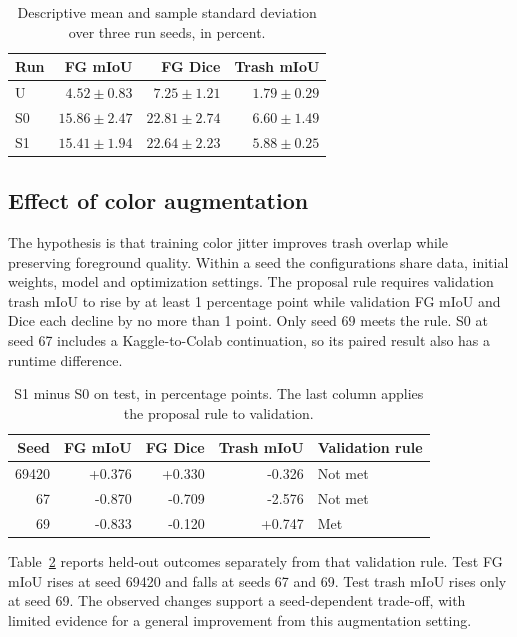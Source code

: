 \begin{table}[H]\centering\small
\caption{Descriptive mean and sample standard deviation over three run seeds, in percent.}\label{tab:final-aggregate}
\begin{tabular}{@{}lrrr@{}}\toprule
Run & FG mIoU & FG Dice & Trash mIoU \\\midrule
U & $4.52 \pm 0.83$ & $7.25 \pm 1.21$ & $1.79 \pm 0.29$ \\
S0 & $15.86 \pm 2.47$ & $22.81 \pm 2.74$ & $6.60 \pm 1.49$ \\
S1 & $15.41 \pm 1.94$ & $22.64 \pm 2.23$ & $5.88 \pm 0.25$ \\
\bottomrule
\end{tabular}
\end{table}

\subsection{Effect of color augmentation}
The hypothesis is that training color jitter improves trash overlap while preserving foreground quality. Within a seed the configurations share data, initial weights, model and optimization settings. The proposal rule requires validation trash mIoU to rise by at least 1 percentage point while validation FG mIoU and Dice each decline by no more than 1 point. Only seed 69 meets the rule. S0 at seed 67 includes a Kaggle-to-Colab continuation, so its paired result also has a runtime difference.

\begin{table}[H]\centering\small
\caption{S1 minus S0 on test, in percentage points. The last column applies the proposal rule to validation.}\label{tab:final-paired-deltas}
\begin{tabular}{@{}rrrrl@{}}\toprule
Seed & FG mIoU & FG Dice & Trash mIoU & Validation rule \\\midrule
69420 & +0.376 & +0.330 & -0.326 & Not met \\
67 & -0.870 & -0.709 & -2.576 & Not met \\
69 & -0.833 & -0.120 & +0.747 & Met \\
\bottomrule
\end{tabular}
\end{table}

Table~\ref{tab:final-paired-deltas} reports held-out outcomes separately from that validation rule. Test FG mIoU rises at seed 69420 and falls at seeds 67 and 69. Test trash mIoU rises only at seed 69. The observed changes support a seed-dependent trade-off, with limited evidence for a general improvement from this augmentation setting.

